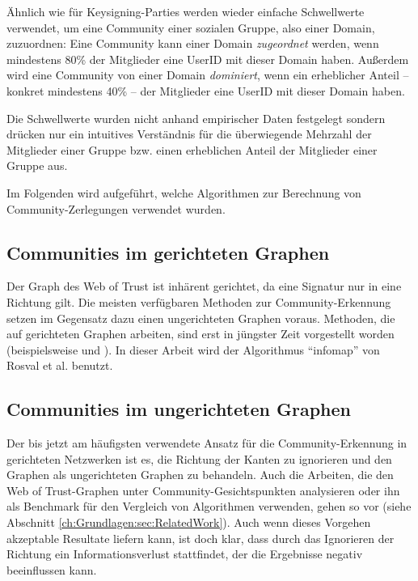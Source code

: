 Ähnlich wie für Keysigning-Parties werden wieder einfache
Schwellwerte verwendet, um eine Community einer sozialen Gruppe, also
einer Domain, zuzuordnen: Eine Community kann einer Domain
\emph{zugeordnet} werden, wenn mindestens 80\% der Mitglieder
eine UserID mit dieser Domain haben. Außerdem wird eine Community von
einer Domain \emph{dominiert}, wenn ein erheblicher Anteil -- konkret
mindestens 40\% -- der Mitglieder eine UserID mit dieser Domain haben.

Die Schwellwerte wurden nicht anhand empirischer Daten festgelegt
sondern drücken nur ein intuitives Verständnis für die
überwiegende Mehrzahl der Mitglieder einer Gruppe bzw. einen
erheblichen Anteil der Mitglieder einer Gruppe aus.

Im Folgenden wird aufgef\"uhrt, welche Algorithmen zur Berechnung von
Community-Zerlegungen verwendet wurden.

\subsection{Communities im gerichteten Graphen}
\label{sec:comm-gericht-graph}
Der Graph des Web of Trust ist inhärent gerichtet, da eine Signatur
nur in eine Richtung gilt. Die meisten verfügbaren Methoden zur
Community-Erkennung setzen im Gegensatz dazu einen ungerichteten
Graphen voraus. Methoden, die auf gerichteten Graphen arbeiten, sind
erst in jüngster Zeit vorgestellt worden (beispielsweise
\cite{Leicht2008} und \cite{Rosvall2008}). In dieser Arbeit wird der Algorithmus
``infomap'' von Rosval et al. \cite{Rosvall2008} benutzt. 

\subsection{Communities im ungerichteten Graphen}
\label{sec:comm-unger-graph}

Der bis jetzt am häufigsten verwendete Ansatz für die
Community-Erkennung in gerichteten Netzwerken ist es, die Richtung der
Kanten zu ignorieren und den Graphen als ungerichteten Graphen zu
behandeln. Auch die Arbeiten, die den Web of Trust-Graphen unter
Community-Gesichtspunkten analysieren oder ihn als Benchmark für den
Vergleich von Algorithmen verwenden, gehen so vor (siehe Abschnitt
\ref{ch:Grundlagen:sec:RelatedWork}). Auch wenn dieses Vorgehen akzeptable Resultate
liefern kann, ist doch klar, dass durch das Ignorieren der Richtung
ein Informationsverlust stattfindet, der die Ergebnisse negativ
beeinflussen kann.

